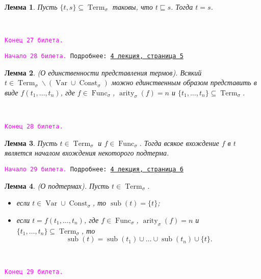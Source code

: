 \documentclass[a4paper,100pt]{article}
\theoremstyle{indented}
\newtheorem{lemma}{Лемма}
\theoremstyle{definition}
\theoremstyle{remark}
\DeclareMathOperator{\Func}{Func}
\DeclareMathOperator{\Const}{Const}
\DeclareMathOperator{\arity}{arity}
\DeclareMathOperator{\Var}{Var}
\DeclareMathOperator{\Term}{Term}
\DeclareMathOperator{\sub}{sub}
\begin{document}
\begin{lemma}
  Пусть $\{t, s\}\subseteq \Term_\sigma$ таковы, что $t\sqsubseteq s$. Тогда $t=s$. 
\end{lemma} \

\texttt{\textcolor{magenta}{Конец 27 билета.}} 

\hrulefill

\texttt{\hypertarget{b28}{\textcolor{magenta}{Начало 28 билета.}} Подробнее: \href{http://www.mi-ras.ru/~speranski/courses/logic-1-2021-spring/slides_4.pdf}{4 лекция, страница 5}} \\

\begin{lemma}
  (О единственности представления термов). Всякий $t\in \Term_\sigma \backslash (\Var\cup\Const_\sigma)$ можно единственным образом представить в виде $f(t_1, \ldots, t_n)$, где $f\in \Func_\sigma$, $\arity_\sigma(f)=n$ и $\{t_1, \ldots, t_n\}\subseteq \Term_\sigma$. 
\end{lemma} \

\texttt{\textcolor{magenta}{Конец 28 билета.}} 

\hrulefill

\begin{lemma}
  Пусть $t\in \Term_\sigma$ и $f\in \Func_\sigma$. Тогда всякое вхождение $f$ в $t$ является началом вхождения некоторого подтерма.
\end{lemma} 

\hrulefill

\texttt{\hypertarget{b29}{\textcolor{magenta}{Начало 29 билета.}} Подробнее: \href{http://www.mi-ras.ru/~speranski/courses/logic-1-2021-spring/slides_4.pdf}{4 лекция, страница 6}} \\

\begin{lemma}
  (О подтермах). Пусть $t\in\Term_\sigma$. 

  \begin{itemize}
    \item если $t\in \Var \cup \Const_\sigma$, то $\sub(t)=\{t\}$;
    \item если $t=f(t_1, \ldots, t_n)$, где $f\in \Func_\sigma$, $\arity_\sigma(f)=n$ и $\{t_1, \ldots, t_n\}\subseteq \Term_\sigma$, то 
    \[
      \sub(t)=\sub(t_1)\cup\ldots\cup \sub(t_n)\cup \{ t \}. 
    \]
  \end{itemize}
\end{lemma} \ 

\texttt{\textcolor{magenta}{Конец 29 билета.}} 

\hrulefill
\end{document}
